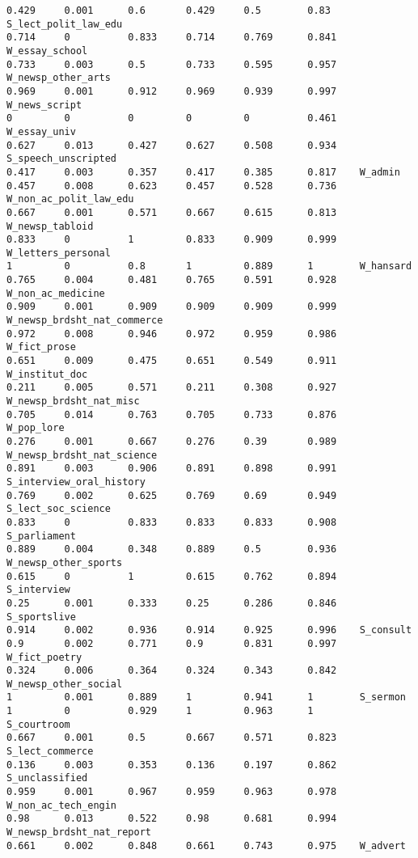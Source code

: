 \begin{verbatim}
0.429     0.001      0.6       0.429     0.5        0.83     S_lect_polit_law_edu
0.714     0          0.833     0.714     0.769      0.841    W_essay_school
0.733     0.003      0.5       0.733     0.595      0.957    W_newsp_other_arts
0.969     0.001      0.912     0.969     0.939      0.997    W_news_script
0         0          0         0         0          0.461    W_essay_univ
0.627     0.013      0.427     0.627     0.508      0.934    S_speech_unscripted
0.417     0.003      0.357     0.417     0.385      0.817    W_admin
0.457     0.008      0.623     0.457     0.528      0.736    W_non_ac_polit_law_edu
0.667     0.001      0.571     0.667     0.615      0.813    W_newsp_tabloid
0.833     0          1         0.833     0.909      0.999    W_letters_personal
1         0          0.8       1         0.889      1        W_hansard
0.765     0.004      0.481     0.765     0.591      0.928    W_non_ac_medicine
0.909     0.001      0.909     0.909     0.909      0.999    W_newsp_brdsht_nat_commerce
0.972     0.008      0.946     0.972     0.959      0.986    W_fict_prose
0.651     0.009      0.475     0.651     0.549      0.911    W_institut_doc
0.211     0.005      0.571     0.211     0.308      0.927    W_newsp_brdsht_nat_misc
0.705     0.014      0.763     0.705     0.733      0.876    W_pop_lore
0.276     0.001      0.667     0.276     0.39       0.989    W_newsp_brdsht_nat_science
0.891     0.003      0.906     0.891     0.898      0.991    S_interview_oral_history
0.769     0.002      0.625     0.769     0.69       0.949    S_lect_soc_science
0.833     0          0.833     0.833     0.833      0.908    S_parliament
0.889     0.004      0.348     0.889     0.5        0.936    W_newsp_other_sports
0.615     0          1         0.615     0.762      0.894    S_interview
0.25      0.001      0.333     0.25      0.286      0.846    S_sportslive
0.914     0.002      0.936     0.914     0.925      0.996    S_consult
0.9       0.002      0.771     0.9       0.831      0.997    W_fict_poetry
0.324     0.006      0.364     0.324     0.343      0.842    W_newsp_other_social
1         0.001      0.889     1         0.941      1        S_sermon
1         0          0.929     1         0.963      1        S_courtroom
0.667     0.001      0.5       0.667     0.571      0.823    S_lect_commerce
0.136     0.003      0.353     0.136     0.197      0.862    S_unclassified
0.959     0.001      0.967     0.959     0.963      0.978    W_non_ac_tech_engin
0.98      0.013      0.522     0.98      0.681      0.994    W_newsp_brdsht_nat_report
0.661     0.002      0.848     0.661     0.743      0.975    W_advert

\end{verbatim}
